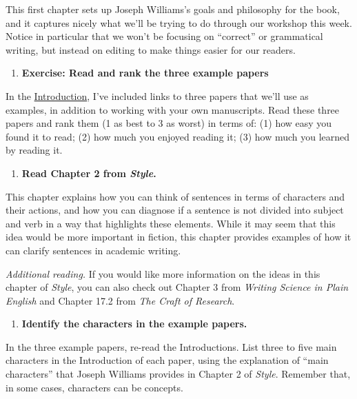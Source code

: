 \documentclass[]{tufte-book}
\providecommand{\tightlist}{%
  \setlength{\itemsep}{0pt}\setlength{\parskip}{0pt}}
\begin{document}
This first chapter sets up Joseph Williams's goals and philosophy for the book,
and it captures nicely what we'll be trying to do through our workshop this
week. Notice in particular that we won't be focusing on ``correct'' or grammatical
writing, but instead on editing to make things easier for our readers.

\begin{enumerate}
\def\labelenumi{\arabic{enumi}.}
\setcounter{enumi}{1}
\tightlist
\item
  \textbf{Exercise: Read and rank the three example papers}
\end{enumerate}

In the
\href{https://geanders.github.io/writing_workshop/1-1-readings-for-the-workshop.html\#readings-for-the-workshop}{Introduction},
I've included links to three papers that we'll use as examples, in addition to
working with your own manuscripts. Read these three papers and rank them (1 as
best to 3 as worst) in terms of: (1) how easy you found it to read; (2) how much
you enjoyed reading it; (3) how much you learned by reading it.

\begin{enumerate}
\def\labelenumi{\arabic{enumi}.}
\setcounter{enumi}{2}
\tightlist
\item
  \textbf{Read Chapter 2 from \emph{Style}.}
\end{enumerate}

This chapter explains how you can think of sentences in terms of characters and
their actions, and how you can diagnose if a sentence is not divided into
subject and verb in a way that highlights these elements. While it may seem that
this idea would be more important in fiction, this chapter provides examples of how
it can clarify sentences in academic writing.

\emph{Additional reading.} If you would like more information on the ideas in this
chapter of \emph{Style}, you can also check out Chapter 3 from \emph{Writing Science in Plain English}
and Chapter 17.2 from \emph{The Craft of Research}.

\begin{enumerate}
\def\labelenumi{\arabic{enumi}.}
\setcounter{enumi}{3}
\tightlist
\item
  \textbf{Identify the characters in the example papers.}
\end{enumerate}

In the three example papers, re-read the Introductions. List three to five main
characters in the Introduction of each paper, using the explanation of ``main characters''
that Joseph Williams provides in Chapter 2 of \emph{Style}. Remember that, in some cases,
characters can be concepts.
\end{document}

